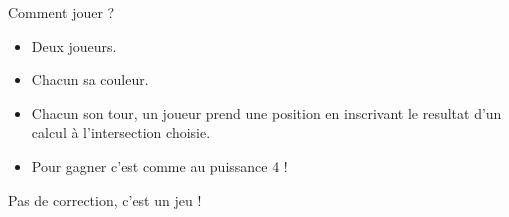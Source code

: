 \numeroteEnigme
\begin{enigme}
    Comment jouer ?
    \begin{itemize}
        \item Deux joueurs.
        \item Chacun sa couleur.
        \item Chacun son tour, un joueur prend une position en inscrivant le resultat d'un calcul à l'intersection choisie.
        \item Pour gagner c'est comme au puissance 4 !
    \end{itemize}
    
    \PQuatre[Relatif,Couleur=.2Gray+.8White]{}
\end{enigme}

\addtocounter{exercice}{-1}
\begin{corrige}
Pas de correction, c'est un jeu !
\end{corrige}